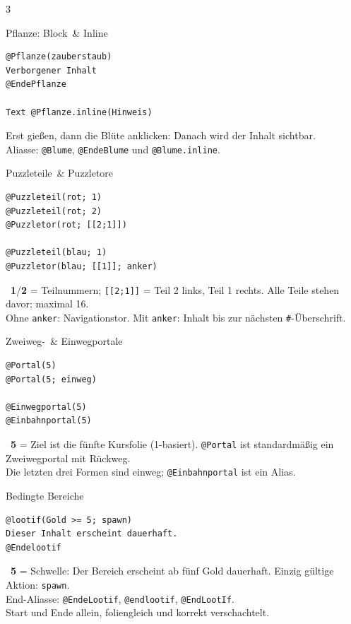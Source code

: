 \documentclass[a4paper,landscape,9pt]{extarticle}
\newcommand{\prevsm}[1]{{\footnotesize\color{muted} #1}}
\newcommand{\lootval}[1]{{\ttfamily\bfseries\color{lootteal}#1}}
\begin{document}
\begin{multicols}{3}
\begin{lootcard}{Pflanze: Block \,\& Inline}
\begin{lstlisting}[language=lia]
@Pflanze(zauberstaub)
Verborgener Inhalt
@EndePflanze

Text @Pflanze.inline(Hinweis)
\end{lstlisting}
\tcblower
\prevsm{Erst gießen, dann die Blüte anklicken: Danach wird der Inhalt sichtbar.\\[2pt]
Aliasse: \texttt{@Blume}, \texttt{@EndeBlume} und \texttt{@Blume.inline}.}
\end{lootcard}

\columnbreak

\begin{lootcard}{Puzzleteile \,\& Puzzletore}
\begin{lstlisting}[language=lia]
@Puzzleteil(rot; 1)
@Puzzleteil(rot; 2)
@Puzzletor(rot; [[2;1]])

@Puzzleteil(blau; 1)
@Puzzletor(blau; [[1]]; anker)
\end{lstlisting}
\tcblower
\prevsm{\faPuzzlePiece~\lootval{1}/\lootval{2} = Teilnummern; \texttt{[[2;1]]} = Teil 2 links, Teil 1 rechts. Alle Teile stehen davor; maximal 16.\\[2pt]
Ohne \texttt{anker}: Navigationstor. Mit \texttt{anker}: Inhalt bis zur nächsten \texttt{\#}-Überschrift.}
\end{lootcard}

\begin{lootcard}{Zweiweg- \,\& Einwegportale}
\begin{lstlisting}[language=lia]
@Portal(5)
@Portal(5; einweg)

@Einwegportal(5)
@Einbahnportal(5)
\end{lstlisting}
\tcblower
\prevsm{\faUndo~\lootval{5} = Ziel ist die fünfte Kursfolie (1-basiert). \texttt{@Portal} ist standardmäßig ein Zweiwegportal mit Rückweg.\\[2pt]
Die letzten drei Formen sind einweg; \texttt{@Einbahnportal} ist ein Alias.}
\end{lootcard}

\begin{lootcard}{Bedingte Bereiche}
\begin{lstlisting}[language=lia]
@lootif(Gold >= 5; spawn)
Dieser Inhalt erscheint dauerhaft.
@Endelootif
\end{lstlisting}
\tcblower
\prevsm{\faEye~\lootval{5} = Schwelle: Der Bereich erscheint ab fünf Gold dauerhaft. Einzig gültige Aktion: \texttt{spawn}.\\[2pt]
End-Aliasse: \texttt{@EndeLootif}, \texttt{@endlootif}, \texttt{@EndLootIf}.\\[2pt]
{\footnotesize Start und Ende allein, foliengleich und korrekt verschachtelt.}}
\end{lootcard}


\end{multicols}
\end{document}
